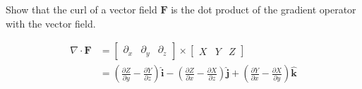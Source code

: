 Show that the curl of a vector field $\boldsymbol{F}$ is the dot product of the gradient operator with the vector field.

\begin{solution}
\begin{align*}
    \nabla \cdot \boldsymbol{F} &= \begin{bmatrix}\partial_x & \partial_y & \partial_z\end{bmatrix} \times \begin{bmatrix} X & Y & Z\end{bmatrix} \\
    &= \left(\frac{\partial Z}{\partial y} - \frac{\partial Y}{\partial z}\right) \boldsymbol{\hat{i}} - \left(\frac{\partial Z}{\partial x} - \frac{\partial X}{\partial z}\right) \boldsymbol{\hat{j}} + \left(\frac{\partial Y}{\partial x} - \frac{\partial X}{\partial y}\right) \boldsymbol{\hat{k}} \\
\end{align*}
\end{solution}